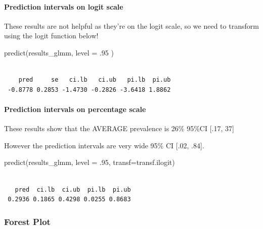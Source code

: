 \documentclass[
  letterpaper,
  DIV=11,
  numbers=noendperiod]{scrartcl}
\let\oldparagraph\paragraph
\renewcommand{\paragraph}[1]{\oldparagraph{#1}\mbox{}}
\newenvironment{Shaded}{\begin{snugshade}}{\end{snugshade}}
\newcommand{\AttributeTok}[1]{\textcolor[rgb]{0.40,0.45,0.13}{#1}}
\newcommand{\DecValTok}[1]{\textcolor[rgb]{0.68,0.00,0.00}{#1}}
\newcommand{\FunctionTok}[1]{\textcolor[rgb]{0.28,0.35,0.67}{#1}}
\newcommand{\NormalTok}[1]{\textcolor[rgb]{0.00,0.23,0.31}{#1}}
\begin{document}
\paragraph{Prediction intervals on logit
scale}\label{prediction-intervals-on-logit-scale}

These results are not helpful as they're on the logit scale, so we need
to transform using the logit function below!

\begin{Shaded}
\begin{Highlighting}[]
\FunctionTok{predict}\NormalTok{(results\_glmm,}
        \AttributeTok{level =}\NormalTok{ .}\DecValTok{95}
\NormalTok{        )}
\end{Highlighting}
\end{Shaded}

\begin{verbatim}

    pred     se   ci.lb   ci.ub   pi.lb  pi.ub 
 -0.8778 0.2853 -1.4730 -0.2826 -3.6418 1.8862 
\end{verbatim}

\paragraph{Prediction intervals on percentage
scale}\label{prediction-intervals-on-percentage-scale}

These results show that the AVERAGE prevalence is 26\% 95\%CI {[}.17,
37{]}

However the prediction intervals are very wide 95\% CI {[}.02, .84{]}.

\begin{Shaded}
\begin{Highlighting}[]
\FunctionTok{predict}\NormalTok{(results\_glmm, }
        \AttributeTok{level =}\NormalTok{ .}\DecValTok{95}\NormalTok{,}
        \AttributeTok{transf=}\NormalTok{transf.ilogit)}
\end{Highlighting}
\end{Shaded}

\begin{verbatim}

   pred  ci.lb  ci.ub  pi.lb  pi.ub 
 0.2936 0.1865 0.4298 0.0255 0.8683 
\end{verbatim}

\subsubsection{Forest Plot}\label{forest-plot}
\end{document}
